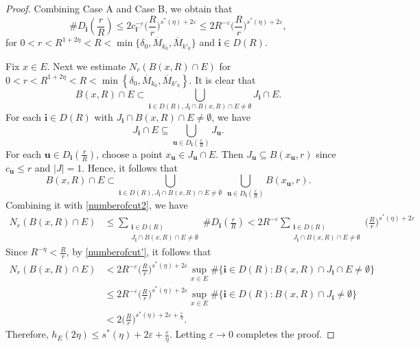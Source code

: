 \documentclass[12pt]{amsart}
\numberwithin{equation}{section}
\theoremstyle{plain}
\theoremstyle{remark}
\theoremstyle{definition}
\newcommand{\om}{\overline{M}}
\newcommand{\iii}{\mathbf{i}}
\newcommand{\bu}{\mathbf{u}}
\newcommand{\eps}{\varepsilon}
\newcommand{\de}{\delta}
\newcommand{\f}{\frac}
\renewcommand{\le}{\leqslant}
\begin{document}
\begin{proof}
		Combining Case A and Case B, we obtain that
		\begin{equation}\label{numberofcut2}
			\#D_{\iii}\left(\f rR\right)\le 2c_{\iii^-}^{-{\eps}}\Big(\f Rr\Big)^{s^*(\eta)+2\eps} \le 2R^{-{\eps}}\Big(\f Rr\Big)^{s^*(\eta)+2\eps},
		\end{equation}
		for $0<r<R^{1+2\eta}<R<\min \{ \de_0,\om_{k_0},\om_{k'_0} \}$ and $\iii\in D(R)$.

		
		Fix $x\in E$. Next we estimate $N_r(B(x,R)\cap E)$ for $0<r<R^{1+2\eta}<R<\min\left\{ \de_0,\om_{k_0},\om_{k'_0}\right\}$. It is clear that
		\[
		B(x,R)\cap E\subset \bigcup_{\iii\in D(R),J_{\iii}\cap B(x,R)\cap E\neq \emptyset} J_{\iii}\cap E.
		\]
		For each $\iii\in D(R)$ with $J_{\iii}\cap B(x,R)\cap E\neq \emptyset$, we have
		\[
		J_{\iii}\cap E\subseteq\bigcup_{\bu\in D_{\iii}\left(\frac r R\right)} J_{\bu}.
		\]
		For each $\bu\in D_{\iii}\left(\frac r R\right)$, choose a point $x_\bu\in J_\bu\cap E$. Then $	J_{\bu}\subseteq B(x_{\bu},r) $ since  $c_{\bu}\le  r$ and $|J|=1$.
		Hence, it follows that 
		\[
		B(x,R)\cap E\subset\bigcup_{\iii\in D(R),J_{\iii}\cap B(x,R)\cap E\neq \emptyset}\ \bigcup_{\bu\in D_{\iii}\left(\frac r R\right)}B(x_{\bu},r).
		\]
		Combining it with \eqref{numberofcut2}, we have 
		\begin{align*}
			N_r(B(x,R)\cap E)&\le \sum_{\substack{\iii\in D(R)\\J_{\iii}\cap B(x,R)\cap E\neq \emptyset}}\# D_{\iii}\left(\frac r R\right)<2R^{-{\eps}}\sum_{\substack{\iii\in D(R)\\J_{\iii}\cap B(x,R)\cap E\neq \emptyset}}\Big(\frac R r\Big)^{s^*(\eta)+2\eps} 
		\end{align*}	
		Since $R^{-\eta}<\f Rr$, by \eqref{numberofcut'}, it follows that 
		\begin{align*}
			N_r(B(x,R)\cap E)
			&<2R^{-{\eps}}\Big(\frac R r\Big)^{s^*(\eta)+2\eps}\sup_{x\in E}\#\{\iii\in D(R):B(x,R)\cap J_{\iii}\cap E\neq \emptyset\}\\
			&\le 2R^{-{\eps}}\Big(\frac R r\Big)^{s^*(\eta)+2\eps}\sup_{x\in E}\#\{\iii\in D(R):B(x,R)\cap J_{\iii}\neq \emptyset\}\\
			&<2\Big(\frac R r\Big)^{s^*(\eta)+2\eps+\f{\eps}{\eta}}.
		\end{align*}
		Therefore, $h_E(2\eta)\le s^*(\eta)+2\eps+\f{\eps}{\eta}.$  Letting $\eps\to 0$ completes the proof.
	\end{proof}
	
\end{document}
